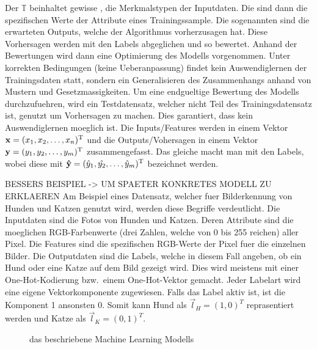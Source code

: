 \documentclass[../main]{subfiles}
\begin{document}
Der  $\mathbb{T}$ beinhaltet gewisse , die Merkmalstypen der Inputdaten.
Die  sind dann die spezifischen Werte der Attribute eines Trainingssample.
Die sogenannten  sind die erwarteten Outputs, welche der Algorithmus vorherzusagen hat.
Diese Vorhersagen werden mit den Labels abgeglichen und so bewertet.
Anhand der Bewertungen wird dann eine Optimierung des Modells vorgenommen.
Unter korrekten Bedingungen (keine Ueberanpassung) findet kein Auswendiglernen der Trainingsdaten statt,
sondern ein Generalisieren des Zusammenhangs anhand von Mustern und Gesetzmassigkeiten.
\para
Um eine endgueltige Bewertung des Modells durchzufuehren, wird ein Testdatensatz, welcher nicht Teil des Trainingsdatensatz ist, genutzt um Vorhersagen zu machen.
Dies garantiert, dass kein Auswendiglernen moeglich ist.
\para
Die Inputs/Features werden in einem Vektor $\vec{x}=\trans{(x_1,x_2,\ldots,x_n)}$ und die Outputs/Vohersagen in einem Vektor $\vec{y}=\trans{(y_1,y_2,\ldots,y_m)}$ zusammengefasst.
Das gleiche macht man mit den Labels, wobei diese mit $\vec{\hat{y}}=\trans{(\hat{y}_1,\hat{y_2},\ldots,\hat{y}_m)}$ bezeichnet werden.
\par \medskip
BESSERS BEISPIEL -> UM SPAETER KONKRETES MODELL ZU ERKLAEREN
Am Beispiel eines Datensatz, welcher fuer Bilderkennung von Hunden und Katzen genutzt wird, werden diese Begriffe verdeutlicht.
Die Inputdaten sind die Fotos von Hunden und Katzen. Deren Attribute sind die moeglichen RGB-Farbenwerte (drei Zahlen, welche von 0 bis 255 reichen) aller Pixel.
Die Features sind die spezifischen RGB-Werte der Pixel fuer die einzelnen Bilder. Die Outputdaten sind die Labels, welche in diesem Fall angeben, ob ein Hund oder eine Katze auf dem Bild gezeigt wird.
Dies wird meistens mit einer One-Hot-Kodierung bzw.\ einem One-Hot-Vektor
gemacht. Jeder Labelart wird eine eigene Vektorkomponente zugewiesen. Falls das
Label aktiv ist, ist die Komponent 1 ansonsten 0. Somit kann Hund als $\vec{l}_H={(1,0)}^T$ reprasentiert werden und Katze als $\vec{l}_K={(0,1)}^T$.

\begin{figure}[h!]
  \centering
  \begin{tikzpicture}[node distance=5cm,auto]

  \end{tikzpicture}

  \caption{das beschriebene Machine Learning Modells}
\end{figure}
\end{document}
